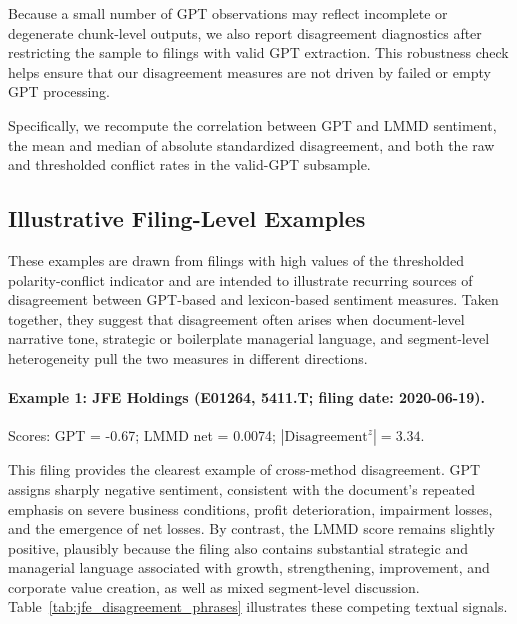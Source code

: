 Because a small number of GPT observations may reflect incomplete or degenerate
chunk-level outputs, we also report disagreement diagnostics after restricting
the sample to filings with valid GPT extraction. This robustness check helps
ensure that our disagreement measures are not driven by failed or empty GPT
processing.

Specifically, we recompute the correlation between GPT and LMMD sentiment, the
mean and median of absolute standardized disagreement, and both the raw and
thresholded conflict rates in the valid-GPT subsample.

\subsection{Illustrative Filing-Level Examples}
\label{app:disagreement_examples}

These examples are drawn from filings with high values of the thresholded
polarity-conflict indicator and are intended to illustrate recurring sources of
disagreement between GPT-based and lexicon-based sentiment measures. Taken
together, they suggest that disagreement often arises when document-level
narrative tone, strategic or boilerplate managerial language, and segment-level
heterogeneity pull the two measures in different directions.

\paragraph{Example 1: JFE Holdings (E01264, 5411.T; filing date: 2020-06-19).}
Scores: GPT = -0.67; LMMD net = 0.0074; 
$|\mathrm{Disagreement}^{z}| = 3.34$.

This filing provides the clearest example of cross-method disagreement. GPT
assigns sharply negative sentiment, consistent with the document’s repeated
emphasis on severe business conditions, profit deterioration, impairment losses,
and the emergence of net losses. By contrast, the LMMD score remains slightly
positive, plausibly because the filing also contains substantial strategic and
managerial language associated with growth, strengthening, improvement, and
corporate value creation, as well as mixed segment-level discussion.
Table~\ref{tab:jfe_disagreement_phrases} illustrates these competing textual
signals.

